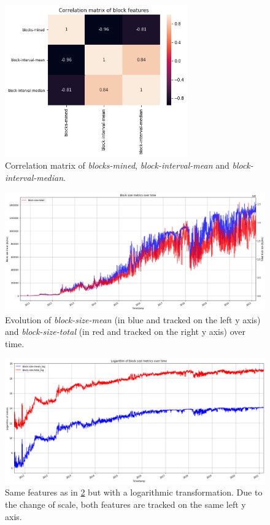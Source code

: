 \begin{figure}[H]
    \centering
    \includegraphics[width=0.7\textwidth]{methods/images/block_production_blocks_mined_corr.png}
    \caption{Correlation matrix of \emph{blocks-mined}, \emph{block-interval-mean} and \emph{block-interval-median}.}
    \label{fig:blocks_production_blocks_mined_corr}
\end{figure}

\begin{figure}[H]
    \centering
    \includegraphics[width=\textwidth]{methods/images/block_size.png}
    \caption{Evolution of \emph{block-size-mean} (in blue and tracked on the left y axis) and \emph{block-size-total} (in red and tracked on the right y axis) over time.}
    \label{fig:block_size}
\end{figure}

\begin{figure}[H]
    \centering
    \includegraphics[width=\textwidth]{methods/images/block_size_log.png}
    \caption{Same features as in \ref{fig:block_size} but with a logarithmic transformation. Due to the change of scale, both features are tracked on the same left y axis.}
    \label{fig:block_size_log}
\end{figure}

